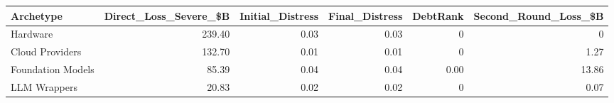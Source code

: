 

\begin{tabular}{@{}lrrrrr@{}}
\toprule
Archetype & Direct\_Loss\_Severe\_\$B & Initial\_Distress & Final\_Distress & DebtRank & Second\_Round\_Loss\_\$B \\
\midrule
Hardware & 239.40 & 0.03 & 0.03 & 0 & 0 \\
Cloud Providers & 132.70 & 0.01 & 0.01 & 0 & 1.27 \\
Foundation Models & 85.39 & 0.04 & 0.04 & 0.00 & 13.86 \\
LLM Wrappers & 20.83 & 0.02 & 0.02 & 0 & 0.07 \\
\bottomrule
\end{tabular}